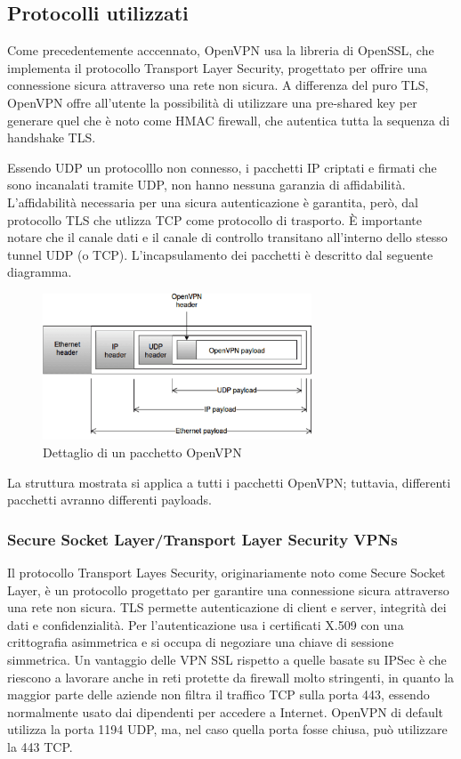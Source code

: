 \subsection{Protocolli utilizzati}
Come precedentemente acccennato, OpenVPN usa la libreria di OpenSSL, che implementa il protocollo Transport Layer Security, progettato per offrire una connessione sicura attraverso una rete non sicura.
A differenza del puro TLS, OpenVPN offre all'utente la possibilità di utilizzare una pre-shared key per generare quel che è noto come HMAC firewall, che autentica tutta la sequenza di handshake TLS.

Essendo UDP un protocolllo non connesso, i pacchetti IP criptati e firmati che sono incanalati tramite UDP, non hanno nessuna garanzia di affidabilità. L'affidabilità necessaria per una sicura autenticazione è garantita, però, dal protocollo TLS che utlizza TCP come protocollo di trasporto.
È importante notare che il canale dati e il canale di controllo transitano all'interno dello stesso tunnel UDP (o TCP). L'incapsulamento dei pacchetti è descritto dal seguente diagramma.

\begin{figure}
    \centering
    \includegraphics[width=8cm]{figure/OVPN_packet.png}
    \caption{Dettaglio di un pacchetto OpenVPN}
\end{figure}

La struttura mostrata si applica a tutti i pacchetti OpenVPN; tuttavia, differenti pacchetti avranno differenti payloads.


\subsubsection{Secure Socket Layer/Transport Layer Security VPNs}
Il protocollo Transport Layes Security, originariamente noto come Secure Socket Layer, è un protocollo progettato per garantire una connessione sicura attraverso una rete non sicura. TLS permette autenticazione di client e server, integrità dei dati e confidenzialità. Per l'autenticazione usa i certificati X.509 \cite[RFC5280]{RFC5280} con una crittografia asimmetrica e si occupa di negoziare una chiave di sessione simmetrica.
Un vantaggio delle VPN SSL rispetto a quelle basate su IPSec è che riescono a lavorare anche in reti protette da firewall molto stringenti, in quanto la maggior parte delle aziende non filtra il traffico TCP sulla porta 443, essendo normalmente usato dai dipendenti per accedere a Internet. OpenVPN di default utilizza la porta 1194 UDP, ma, nel caso quella porta fosse chiusa, può utilizzare la 443 TCP.


